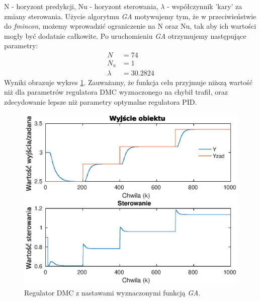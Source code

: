N - horyzont predykcji,
Nu - horyzont sterowania,
$\lambda$ - współczynnik 'kary' za zmiany sterowania.
Użycie algorytmu \emph{GA} motywujemy tym, że w przeciwieństwie do \emph{fmincon}, możemy wprowadzić ograniczenie na N oraz Nu, tak aby ich wartości mogły być dodatnie całkowite.
Po uruchomieniu \emph{GA} otrzymujemy następujące parametry:
\begin{align}
  N &= 74 \nonumber \\
  N_u &= 1 \\
  \lambda &= 30.2824 \nonumber
\end{align}
Wyniki obrazuje wykres \ref{fig:optim_dmc}.
Zauważamy, że funkcja celu przyjmuje niższą wartość niż dla parametrów regulatora DMC wyznaczonego na chybił trafił, oraz zdecydowanie lepsze niż parametry optymalne regulatora PID.
\begin{figure}
  \includegraphics{wykresy/optim_dmc.eps}
  \caption{Regulator DMC z nastawami wyznaczonymi funkcją \emph{GA}.}
  \label{fig:optim_dmc}
\end{figure}
